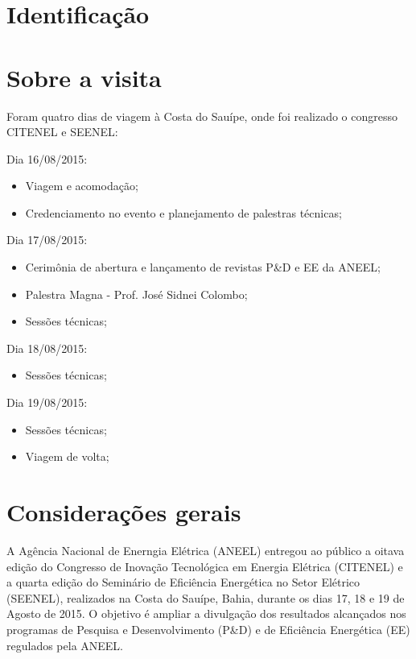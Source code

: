 \documentclass[12pt,a4paper]{article}
\begin{document}



\newpage%
\section{Identificação}



\newpage%
\section{Sobre a visita}
Foram quatro dias de viagem à Costa do Sauípe, onde foi realizado o congresso
CITENEL e SEENEL:

Dia 16/08/2015:
\begin{itemize}
  \item Viagem e acomodação;
  \item Credenciamento no evento e planejamento de palestras técnicas;
\end{itemize}

Dia 17/08/2015:
\begin{itemize}
  \item Cerimônia de abertura e lançamento de revistas P\&D e EE da ANEEL;
  \item Palestra Magna - Prof. José Sidnei Colombo;
  \item Sessões técnicas;
\end{itemize}

Dia 18/08/2015:
\begin{itemize}
  \item Sessões técnicas;
\end{itemize}

Dia 19/08/2015:
\begin{itemize}
  \item Sessões técnicas;
  \item Viagem de volta;
\end{itemize}

\section{Considerações gerais}
A Agência Nacional de Enerngia Elétrica (ANEEL) entregou ao público a oitava
edição do Congresso de Inovação Tecnológica em Energia Elétrica (CITENEL) e a
quarta edição do Seminário de Eficiência Energética no Setor Elétrico (SEENEL),
realizados na Costa do Sauípe, Bahia, durante os dias 17, 18 e 19 de Agosto de
2015. O objetivo é ampliar a divulgação dos resultados alcançados nos
programas de Pesquisa e Desenvolvimento (P\&D) e de Eficiência Energética (EE)
regulados pela ANEEL.
\end{document}
